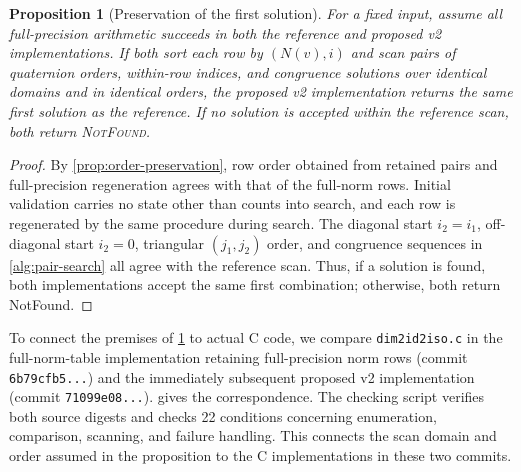 \documentclass[a4paper,10pt]{article}
\newtheorem{proposition}{Proposition}
\theoremstyle{definition}
\theoremstyle{remark}
\begin{document}
\begin{proposition}[Preservation of the first solution]
\label{prop:first-solution}
For a fixed input, assume all full-precision arithmetic succeeds in both the reference and proposed v2 implementations. If both sort each row by $(N(v),i)$ and scan pairs of quaternion orders, within-row indices, and congruence solutions over identical domains and in identical orders, the proposed v2 implementation returns the same first solution as the reference. If no solution is accepted within the reference scan, both return \textup{\textsc{NotFound}}.
\end{proposition}

\begin{proof}
By \cref{prop:order-preservation}, row order obtained from retained pairs and full-precision regeneration agrees with that of the full-norm rows. Initial validation carries no state other than counts into search, and each row is regenerated by the same procedure during search. The diagonal start $i_2=i_1$, off-diagonal start $i_2=0$, triangular $(j_1,j_2)$ order, and congruence sequences in \cref{alg:pair-search} all agree with the reference scan. Thus, if a solution is found, both implementations accept the same first combination; otherwise, both return NotFound.
\end{proof}

To connect the premises of \cref{prop:first-solution} to actual C code, we compare \texttt{dim2id2iso.c} in the full-norm-table implementation retaining full-precision norm rows (commit \texttt{6b79cfb5...}) and the immediately subsequent proposed v2 implementation (commit \texttt{71099e08...}).  gives the correspondence. The checking script verifies both source digests and checks 22 conditions concerning enumeration, comparison, scanning, and failure handling. This connects the scan domain and order assumed in the proposition to the C implementations in these two commits.
\end{document}
